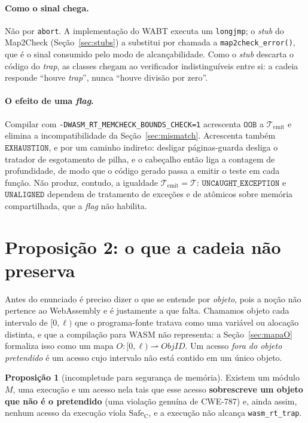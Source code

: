 \documentclass[11pt,a4paper]{article}
\theoremstyle{definition}
\newtheorem{proposicao}{Proposição}
\newcommand{\Safe}{\mathrm{Safe}}
\newcommand{\code}[1]{\texttt{#1}}
\begin{document}
\paragraph{Como o sinal chega.} Não por \code{abort}. A implementação do WABT
executa um \code{longjmp}; o \emph{stub} do Map2Check
(Seção~\ref{sec:stubs}) a substitui por chamada a \code{map2check\_error()}, que
é o sinal consumido pelo modo de alcançabilidade. Como o \emph{stub} descarta o
código do \emph{trap}, as classes chegam ao verificador indistinguíveis entre si:
a cadeia responde ``houve \emph{trap}'', nunca ``houve divisão por zero''.

\paragraph{O efeito de uma \emph{flag}.}
Compilar com \code{-DWASM\_RT\_MEMCHECK\_BOUNDS\_CHECK=1} acrescenta
$\mathtt{OOB}$ a $\mathcal{T}_{\mathrm{emit}}$ e elimina a incompatibilidade da
Seção~\ref{sec:mismatch}. Acrescenta também $\mathtt{EXHAUSTION}$, e por um
caminho indireto: desligar páginas-guarda desliga o tratador de esgotamento de
pilha, e o cabeçalho então liga a contagem de profundidade, de modo que o código
gerado passa a emitir o teste em cada função. Não produz, contudo, a igualdade
$\mathcal{T}_{\mathrm{emit}} = \mathcal{T}$: $\mathtt{UNCAUGHT\_EXCEPTION}$ e
$\mathtt{UNALIGNED}$ dependem de tratamento de exceções e de atômicos sobre
memória compartilhada, que a \emph{flag} não habilita.

\section{Proposição 2: o que a cadeia não preserva}
\label{sec:prop2}

Antes do enunciado é preciso dizer o que se entende por \emph{objeto}, pois a
noção não pertence ao WebAssembly e é justamente a que falta. Chamamos objeto
cada intervalo de $[0,\ell)$ que o programa-fonte tratava como uma variável ou
alocação distinta, e que a compilação para WASM não representa: a
Seção~\ref{sec:mapaO} formaliza isso como um mapa
$O : [0,\ell) \rightharpoonup \mathit{ObjID}$. Um acesso \emph{fora do objeto
pretendido} é um acesso cujo intervalo não está contido em um único objeto.

\begin{proposicao}[incompletude para segurança de memória]
\label{prop:incompleta}
Existem um módulo $M$, uma execução e um acesso nela tais que esse acesso
\textbf{sobrescreve um objeto que não é o pretendido} (uma violação genuína de
CWE-787) e, ainda assim, nenhum acesso da execução viola $\Safe_{\mathrm{C}}$, e
a execução não alcança \code{wasm\_rt\_trap}.
\end{proposicao}
\end{document}
